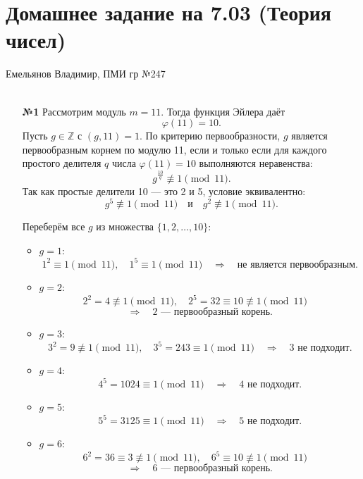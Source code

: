 \documentclass[a4paper]{article}
\begin{document}
\section*{Домашнее задание на 7.03 (Теория чисел)}
 {\large Емельянов Владимир, ПМИ гр №247}\\\\
\begin{enumerate}
    \item[\textbf{№1}]Рассмотрим модуль \( m = 11 \). Тогда функция Эйлера даёт
    \[
    \varphi(11) = 10.
    \]
    Пусть \( g \in \mathbb{Z} \) с \((g,11)=1\). По критерию первообразности, \( g \) является первообразным корнем по модулю 11, если и только если для каждого простого делителя \( q \) числа \( \varphi(11)=10 \) выполняются неравенства:
    \[
    g^{\frac{10}{q}} \not\equiv 1 \pmod{11}.
    \]
    Так как простые делители 10 — это 2 и 5, условие эквивалентно:
    \[
    g^5 \not\equiv 1 \pmod{11} \quad \text{и} \quad g^2 \not\equiv 1 \pmod{11}.
    \]
    
    Переберём все \( g \) из множества \(\{1,2,\dots,10\}\):
    
    \begin{itemize}
        \item \( g = 1 \):
        \[
        1^2 \equiv 1 \pmod{11}, \quad 1^5 \equiv 1 \pmod{11} \quad \Rightarrow \quad \text{не является первообразным.}
        \]
        
        \item \( g = 2 \):
        \[
        2^2 = 4 \not\equiv 1 \pmod{11}, \quad 2^5 = 32 \equiv 10 \not\equiv 
        1 \pmod{11} \quad \]\[\Rightarrow \quad 2 \text{ --- первообразный корень.}
        \]
        
        \item \( g = 3 \):
        \[
        3^2 = 9 \not\equiv 1 \pmod{11}, \quad 3^5 = 243 \equiv 1 \pmod{11} \quad \Rightarrow \quad 3 \text{ не подходит.}
        \]
        
        \item \( g = 4 \):
        \[
        4^5 = 1024 \equiv 1 \pmod{11} \quad \Rightarrow \quad 4 \text{ не подходит.}
        \]
        
        \item \( g = 5 \):
        \[
        5^5 = 3125 \equiv 1 \pmod{11} \quad \Rightarrow \quad 5 \text{ не подходит.}
        \]
        
        \item \( g = 6 \):
        \[
        6^2 = 36 \equiv 3 \not\equiv 1 \pmod{11}, \quad 6^5 \equiv 10 \not\equiv 
        1 \pmod{11} \quad \]\[\Rightarrow \quad 6 \text{ --- первообразный корень.}
        \]
        

\end{itemize}
\end{enumerate}
\end{document}
